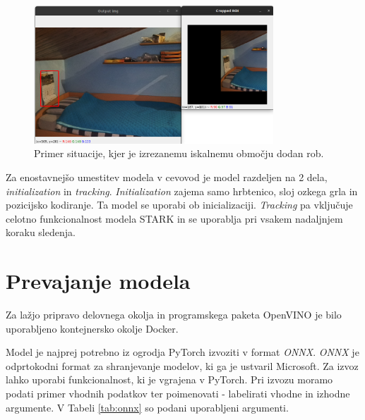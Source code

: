 \documentclass[a4paper,12pt,openright]{book}
\begin{document}
\begin{figure}[htb]
    \begin{center}
        \includegraphics[width=0.8\textwidth]{img/example_mask.png}
    \end{center}
    \caption{Primer situacije, kjer je izrezanemu iskalnemu območju dodan rob.}
    \label{img:mask}
\end{figure}

Za enostavnejšo umestitev modela v cevovod je model razdeljen na 2 dela, \emph{initialization} in \emph{tracking}. \emph{Initialization} zajema samo hrbtenico, sloj ozkega grla in pozicijsko kodiranje. Ta model se uporabi ob inicializaciji. \emph{Tracking} pa vključuje celotno funkcionalnost modela STARK in se uporablja pri vsakem nadaljnjem koraku sledenja.

\section{Prevajanje modela}
Za lažjo pripravo delovnega okolja in programskega paketa OpenVINO je bilo uporabljeno kontejnersko okolje Docker.

Model je najprej potrebno iz ogrodja PyTorch izvoziti v format \emph{ONNX}. \emph{ONNX} je odprtokodni format za shranjevanje modelov, ki ga je ustvaril Microsoft. Za izvoz lahko uporabi funkcionalnost, ki je vgrajena v PyTorch. Pri izvozu moramo podati primer vhodnih podatkov ter poimenovati - labelirati vhodne in izhodne argumente. V Tabeli \ref{tab:onnx} so podani uporabljeni argumenti.
\end{document}

